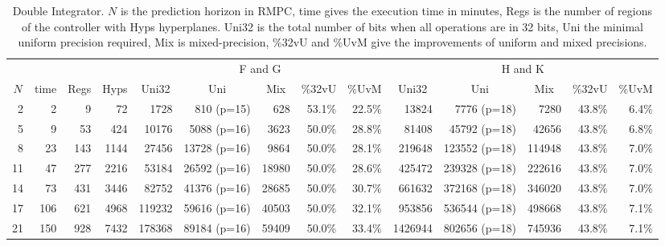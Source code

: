 \begin{table*}[p]
  \centering
  \caption{Double Integrator.\textmd{ $N$ is the prediction horizon in RMPC, time gives the execution time in minutes, Regs is the number of regions of the controller with Hyps hyperplanes. Uni32 is the total number of bits when all operations are in 32 bits, Uni the minimal uniform precision required, Mix is mixed-precision, \%32vU and \%UvM give the improvements of uniform and mixed precisions.}}
  \label{tab:di}
  \renewcommand{\arraystretch}{1.2}
  \setlength{\tabcolsep}{0.5em} %
  \begin{tabular}{rrrr|rrrrr|rrrrr}
    \toprule
    \multicolumn{4}{c}{} & \multicolumn{5}{|c|}{F and G} & \multicolumn{5}{c}{H and K} \\
    \multicolumn{1}{c}{$N$}&
    \multicolumn{1}{c}{time}&
    \multicolumn{1}{c}{Regs} &
    \multicolumn{1}{c}{Hyps} &
    \multicolumn{1}{|c}{Uni32}&
    \multicolumn{1}{c}{Uni}&
    \multicolumn{1}{c}{Mix}&
    \multicolumn{1}{c}{\%32vU}&
    \multicolumn{1}{c}{\%UvM}&
    \multicolumn{1}{|c}{Uni32}&
    \multicolumn{1}{c}{Uni}&
    \multicolumn{1}{c}{Mix}&
    \multicolumn{1}{c}{\%32vU}&
    \multicolumn{1}{c}{\%UvM} \\
    \midrule
    2 & 2 & 9 & 72 & 1728 & 810 (p=15) & 628 & 53.1\% & 22.5\% & 13824 & 7776 (p=18) & 7280 & 43.8\%& 6.4\% \\
    5 & 9 & 53 & 424 & 10176 & 5088 (p=16) & 3623 & 50.0\% & 28.8\% & 81408 & 45792 (p=18) & 42656 & 43.8\% & 6.8\% \\
    8 & 23 & 143 & 1144 & 27456 & 13728 (p=16) & 9864 & 50.0\%  & 28.1\% & 219648 & 123552 (p=18) & 114948 & 43.8\% & 7.0\% \\
    11 & 47 & 277 & 2216 & 53184 & 26592 (p=16) & 18980 & 50.0\% & 28.6\% & 425472 & 239328 (p=18) & 222616 & 43.8\% & 7.0\% \\
    
    14 & 73 & 431& 3446& 82752& 41376 (p=16)& 28685& 50.0\% & 30.7\% & 661632& 372168 (p=18)& 346020& 43.8\% &7.0\% \\
    
    17 & 106 & 621 & 4968 & 119232 & 59616 (p=16) & 40503 & 50.0\% & 32.1\% & 953856& 536544 (p=18)& 498668& 43.8\% & 7.1\% \\
    
    21 & 150 & 928 & 7432 & 178368 & 89184 (p=16) & 59409 & 50.0\% & 33.4\% & 1426944 & 802656 (p=18) & 745936 & 43.8\% & 7.1\%  \\
    

\end{tabular}
\end{table*}
